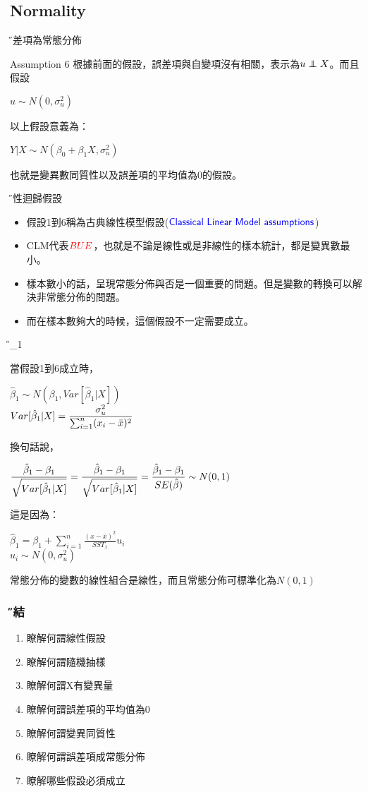 \documentclass[xcolor=dvipsnames]{beamer}
\newcommand\independent{\protect\mathpalette{\protect\independenT}{\perp}}
\def\independenT#1#2{\mathrel{\rlap{$#1#2$}\mkern2mu{#1#2}}}
\begin{document}
\subsection{Normality}
\begin{frame}{\H 誤差項為常態分佈}
\begin{block}{Assumption 6}
根據前面的假設，誤差項與自變項沒有相關，表示為$ u\independent X $。而且假設
\begin{center}
$u\sim N(0,\sigma_{u}^{2})  $
\end{center}
以上假設意義為：
\begin{center}
$  Y|X \sim N(\beta_{0}+\beta_{1}X, \sigma_{u}^{2})$
\end{center}
也就是變異數同質性以及誤差項的平均值為0的假設。
\end{block}
\end{frame}
\begin{frame}{\H 線性迴歸假設}
\begin{itemize}
\item 假設1到6稱為古典線性模型假設($\textcolor{blue}{\textsf {Classical Linear Model assumptions}} $)
\item CLM代表$\textcolor{red}{BUE}$，也就是不論是線性或是非線性的樣本統計，都是變異數最小。
\item 樣本數小的話，呈現常態分佈與否是一個重要的問題。但是變數的轉換可以解決非常態分佈的問題。
\item 而在樣本數夠大的時候，這個假設不一定需要成立。
\end{itemize}
\end{frame}
\begin{frame}{\H \hat{\beta}_{1}}
\begin{theorem}[抽樣分佈]
當假設1到6成立時，
\begin{center}
$\hat{\beta}_{1}\sim N(\beta_{1},Var[\hat{\beta}_{1}|X])$\\
$\mathlarger{Var[\hat{\beta}_{1}|X]=\frac{\sigma_{u}^{2}}{\sum_{i=1}^{n}(x_{i}-\bar{x})^2} } $
\end{center}
換句話說，
\begin{center}
$\mathlarger{\frac{\hat{\beta}_{1}-\beta_{1}}{\sqrt{Var[\hat{\beta}_{1}|X]}}=\frac{\hat{\beta}_{1}-\beta_{1}}{\sqrt{Var[\hat{\beta}_{1}|X]}}=\frac{\hat{\beta}_{1}-\beta_{1}}{SE(\hat{\beta})}\sim N(0,1)}$
\end{center}
\end{theorem}
這是因為：
\begin{center}
$ \hat{\beta}_{1} = \beta_{1}+\sum\limits_{i=1}^{n}\frac{(x-\bar{x})^2}{SST_{x}} u_{i}$\\
$u_{i}\sim N(0,\sigma_{u}^{2})$
\end{center}
常態分佈的變數的線性組合是線性，而且常態分佈可標準化為$ N(0,1) $
\end{frame}

\begin{frame}\frametitle{\H 總結}
\begin{enumerate}
\item {\K 瞭解何謂線性假設}
\item {\K 瞭解何謂隨機抽樣}
\item {\K 瞭解何謂X有變異量}
\item {\K 瞭解何謂誤差項的平均值為0}
\item {\K 瞭解何謂變異同質性}
\item {\K 瞭解何謂誤差項成常態分佈}
\item {\K 瞭解哪些假設必須成立}
\end{enumerate}
\end{frame}
\end{document}
